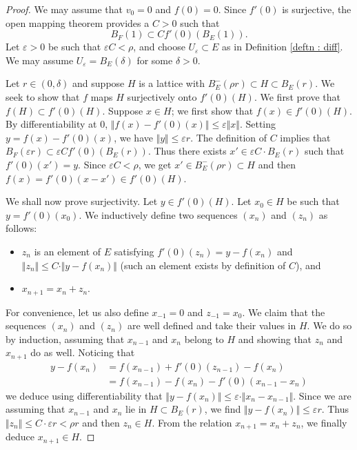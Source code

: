 \documentclass{lms}
\begin{document}
\begin{proof} %
We may assume that $v_0=0$ and $f(0)=0$. Since $f'(0)$ is surjective, the open mapping theorem provides a $C>0$ such that 
\[
B_F(1) \subset C  f'(0)(B_E(1)).
\]
Let $\varepsilon>0$ be such that 
$\varepsilon C < \rho$, and choose $U_\varepsilon \subset E$ as in Definition 
\ref{deftn : diff}.  We may assume $U_\varepsilon = B_E(\delta)$ for some $\delta >0$.

Let $r \in (0, \delta)$ and suppose $H$ is a lattice with $B^-_E(\rho r) \subset H \subset B_E(r).$ 
We seek to show that $f$ maps $H$ surjectively onto $f'(0) (H)$. We first prove 
that $f(H) \subset f'(0) (H)$. Suppose $x \in H$; we first show that $f(x) \in f'(0)(H)$.  By differentiability at 
$0$, $\Vert f(x)-f'(0)(x) \Vert \leq \varepsilon \Vert x \Vert $. 
Setting $y=f(x)-f'(0)(x)$, we have $\Vert y \Vert \leq 
\varepsilon r$. The definition of $C$ implies that $B_F(\varepsilon r) 
\subset \varepsilon C f'(0) (B_E(r))$. Thus there exists $x' \in 
\varepsilon C \cdot B_E(r)$ such that $f'(0) (x') =y$. Since 
$\varepsilon C < \rho$, we get $x' \in B^-_E(\rho r) \subset H$ and 
then $f(x)= f'(0) (x-x') \in f'(0) (H)$.

We shall now prove surjectivity. Let $y \in f'(0) (H)$. Let $x_0 \in H$ 
be such that $y = f'(0) (x_0)$. We inductively define two sequences 
$(x_n)$ and $(z_n)$ as follows:
\begin{itemize}
\item $z_n$ is an element of $E$ satisfying $f'(0)(z_n) = y - 
f(x_n)$ and $\Vert z_n \Vert \leq C \cdot \Vert y - f(x_n) \Vert$ (such 
an element exists by definition of $C$), and
\item $x_{n+1}=x_n+z_n$.
\end{itemize}
For convenience, let us also define $x_{-1} = 0$ and $z_{-1}=x_0.$ We claim that the 
sequences $(x_n)$ and $(z_n)$ are well defined and take their values in 
$H$. We do so by induction, assuming that $x_{n-1}$ and $x_n$ belong to $H$
and showing that $z_n$ and $x_{n+1}$ do as well. Noticing
that 
\begin{equation}
\label{eq:mainlemma}
\begin{aligned}
y - f(x_n) &= f(x_{n-1}) + f'(0)(z_{n-1}) - f(x_n) \\
&= f(x_{n-1}) - f(x_n) - f'(0)(x_{n-1} - x_n)
\end{aligned}
\end{equation}
we deduce using differentiability that
$\Vert y - f(x_n) \Vert \leq \varepsilon \cdot \Vert x_n - x_{n-1}
\Vert$.
Since we are assuming that $x_{n-1}$ and $x_n$ lie in $H \subset
B_E(r)$, we find $\Vert y - f(x_n) \Vert \leq \varepsilon r$. Thus
$\Vert z_n \Vert \leq C \cdot \varepsilon r < \rho r$ and then
$z_n \in H$. From the relation $x_{n+1} = x_n + z_n$, we finally
deduce $x_{n+1} \in H$.


\end{proof}
\end{document}
